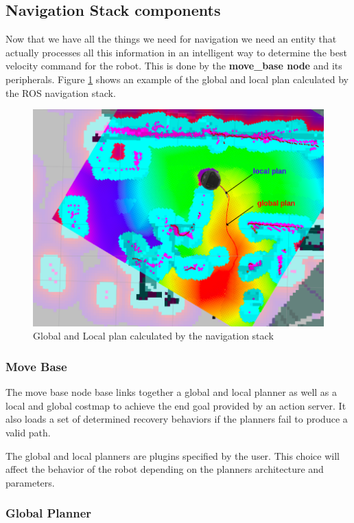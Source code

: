\documentclass[12pt]{article}
\begin{document}
\subsection{Navigation Stack components}
Now that we have all the things we need for navigation we need an entity that actually processes all this information in an intelligent way to determine the best velocity command for the robot. This is done by the \textbf{move\_base node} and its peripherals.
Figure \ref{fig:plans} shows an example of the global and local plan calculated by the ROS navigation stack.
\begin{figure}[!htb]
    \centering
    \includegraphics[width=\linewidth]{rviz_navigation2.png}
    \caption{Global and Local plan calculated by the navigation stack}
    \label{fig:plans}
\end{figure}
\subsubsection{Move Base}

The move base node base links together a global and local planner as well as a local and global costmap to achieve the end goal provided by an action server. It also loads a set of determined recovery behaviors if the planners fail to produce a valid path. 

The global and local planners are plugins specified by the user. This choice will affect the behavior of the robot depending on the planners architecture and parameters. 

\subsubsection{Global Planner}
 
\end{document}
